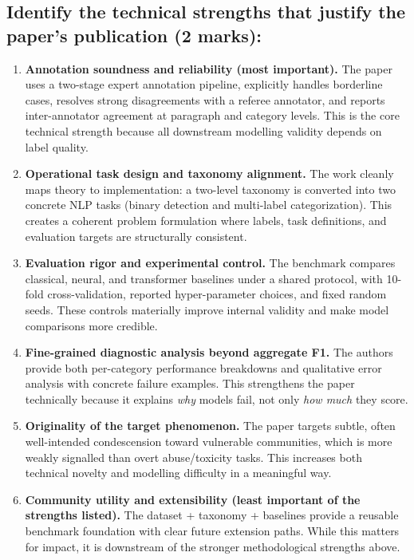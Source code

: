 \documentclass[11pt, a4paper]{article}
\begin{document}
\subsection{Identify the technical strengths that justify the paper's publication (2 marks):}
\begin{enumerate}
  \item \textbf{Annotation soundness and reliability (most important).} The paper uses a two-stage expert annotation pipeline, explicitly handles borderline cases, resolves strong disagreements with a referee annotator, and reports inter-annotator agreement at paragraph and category levels. This is the core technical strength because all downstream modelling validity depends on label quality.

  \item \textbf{Operational task design and taxonomy alignment.} The work cleanly maps theory to implementation: a two-level taxonomy is converted into two concrete NLP tasks (binary detection and multi-label categorization). This creates a coherent problem formulation where labels, task definitions, and evaluation targets are structurally consistent.

  \item \textbf{Evaluation rigor and experimental control.} The benchmark compares classical, neural, and transformer baselines under a shared protocol, with 10-fold cross-validation, reported hyper-parameter choices, and fixed random seeds. These controls materially improve internal validity and make model comparisons more credible.

  \item \textbf{Fine-grained diagnostic analysis beyond aggregate F1.} The authors provide both per-category performance breakdowns and qualitative error analysis with concrete failure examples. This strengthens the paper technically because it explains \textit{why} models fail, not only \textit{how much} they score.

  \item \textbf{Originality of the target phenomenon.} The paper targets subtle, often well-intended condescension toward vulnerable communities, which is more weakly signalled than overt abuse/toxicity tasks. This increases both technical novelty and modelling difficulty in a meaningful way.

  \item \textbf{Community utility and extensibility (least important of the strengths listed).} The dataset + taxonomy + baselines provide a reusable benchmark foundation with clear future extension paths. While this matters for impact, it is downstream of the stronger methodological strengths above.
\end{enumerate}
\end{document}
